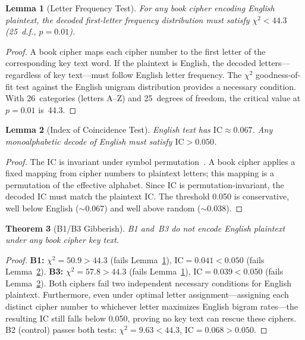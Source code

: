 \documentclass[11pt,a4paper]{article}
\newtheorem{theorem}{Theorem}
\newtheorem{lemma}[theorem]{Lemma}
\begin{document}
\begin{lemma}[Letter Frequency Test]
\label{lem:chisq}
For any book cipher encoding English plaintext, the decoded first-letter
frequency distribution must satisfy $\chi^2 < 44.3$ (25~d.f., $p{=}0.01$).
\end{lemma}

\begin{proof}
A book cipher maps each cipher number to the first letter of the corresponding
key text word. If the plaintext is English, the decoded letters---regardless
of key text---must follow English letter frequency. The $\chi^2$ goodness-of-fit
test against the English unigram distribution provides a necessary condition.
With 26~categories (letters A--Z) and 25~degrees of freedom, the critical value
at $p{=}0.01$ is~44.3.
\end{proof}

\begin{lemma}[Index of Coincidence Test]
\label{lem:ic}
English text has $\text{IC} \approx 0.067$. Any monoalphabetic decode of English
must satisfy $\text{IC} > 0.050$.
\end{lemma}

\begin{proof}
The IC is invariant under symbol permutation~\cite{friedman1987}. A book cipher
applies a fixed mapping from cipher numbers to plaintext letters; this mapping is
a permutation of the effective alphabet. Since IC is permutation-invariant, the
decoded IC must match the plaintext IC. The threshold 0.050 is conservative,
well below English ($\sim$0.067) and well above random ($\sim$0.038).
\end{proof}

\begin{theorem}[B1/B3 Gibberish]
\label{thm:impossibility}
B1 and~B3 do not encode English plaintext under any book cipher key text.
\end{theorem}

\begin{proof}
\textbf{B1:} $\chi^2 = 50.9 > 44.3$ (fails Lemma~\ref{lem:chisq}),
$\text{IC} = 0.041 < 0.050$ (fails Lemma~\ref{lem:ic}).
\textbf{B3:} $\chi^2 = 57.8 > 44.3$ (fails Lemma~\ref{lem:chisq}),
$\text{IC} = 0.039 < 0.050$ (fails Lemma~\ref{lem:ic}).
Both ciphers fail two independent necessary conditions for English plaintext.
Furthermore, even under optimal letter assignment---assigning each distinct
cipher number to whichever letter maximizes English bigram rates---the resulting
IC still falls below 0.050, proving no key text can rescue these ciphers.
B2 (control) passes both tests: $\chi^2 = 9.63 < 44.3$, $\text{IC} = 0.068 > 0.050$.
\end{proof}
\end{document}
